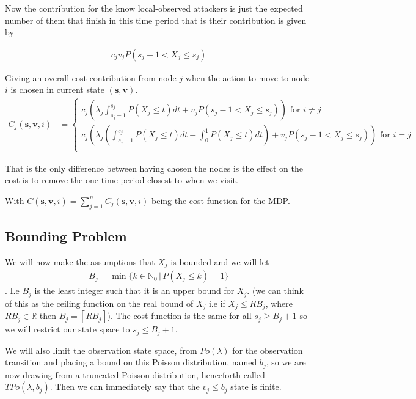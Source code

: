 \documentclass[a4paper,10pt]{article}
\newcommand{\ceil}[1]{\left \lceil #1 \right \rceil}
\theoremstyle{definition}
\theoremstyle{definition}
\theoremstyle{remark}
\theoremstyle{definition}
\begin{document}
Now the contribution for the know local-observed attackers is just the expected number of them that finish in this time period that is their contribution is given by

\begin{align*}
c_{j} v_{j} P(s_{j}-1 < X_{j} \leq s_{j})
\end{align*}


Giving an overall cost contribution from node $j$ when the action to move to node $i$ is chosen in current state $(\bm{s},\bm{v})$.
\begin{align}
C_{j}(\bm{s},\bm{v},i)&= \begin{cases}
c_{j} (\lambda_{j} \int_{s_{j}-1}^{s_{j}} P(X_{j} \leq t) dt + v_{j} P(s_{j}-1 < X_{j} \leq s_{j})) \text{ for } i \neq j \\
c_{j} (\lambda_{j} (\int_{s_{j}-1}^{s_{j}} P(X_{j} \leq t) dt - \int_{0}^{1} P(X_{j} \leq t) dt)+v_{j} P(s_{j}-1 < X_{j} \leq s_{j}))  \text{ for } i=j \\
\end{cases} 
\end{align}

That is the only difference between having chosen the nodes is the effect on the cost is to remove the one time period closest to when we visit.
   
With $C(\bm{s},\bm{v},i)=\sum\limits_{j=1}^{n} C_{j}(\bm{s},\bm{v},i)$ being the cost function for the MDP.

\subsection{Bounding Problem}
We will now make the assumptions that $X_{j}$ is bounded and we will let
\begin{align*}
B_{j}=\min \{k \in \mathbb{N}_{0} \, | \, P(X_{j} \leq k)=1 \}
\end{align*}.
I.e $B_{j}$ is the least integer such that it is an upper bound for $X_{j}$. (we can think of this as the ceiling function on the real bound of  $X_{j}$ i.e if $X_{j} \leq RB_{j}$, where $RB_{j} \in \mathbb{R}$ then $B_{j}=\ceil{RB_{j}}$).
The cost function is the same for all $s_{j} \geq B_{j}+1$ so we will restrict our state space to $s_{j} \leq B_{j}+1$.

We will also limit the observation state space, from $Po(\lambda)$ for the observation transition and placing a bound on this Poisson distribution, named $b_{j}$, so we are now drawing from a truncated Poisson distribution, henceforth called $TPo(\lambda,b_{j})$. Then we can immediately say that the $v_{j} \leq b_{j}$ state is finite.
\end{document}
